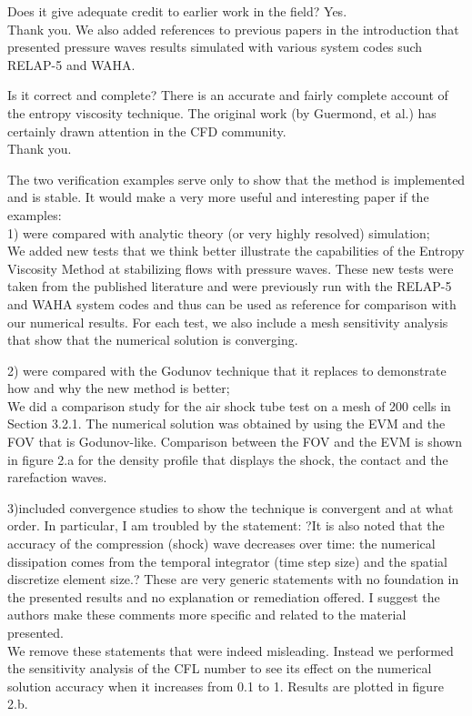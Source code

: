 \documentclass{article}
\begin{document}
\bigskip

{\color{blue}
Does it give adequate credit to earlier work in the field? Yes. \\
}
Thank you. We also added references to previous papers in the introduction that presented pressure waves results simulated with various system codes such RELAP-5 and WAHA.
\bigskip

{\color{blue}
Is it correct and complete?
There is an accurate and fairly complete account of the entropy viscosity technique. The original work (by Guermond, et al.) has certainly drawn attention in the CFD community.\\
}
Thank you.

\bigskip

{\color{blue}
The two verification examples serve only to show that the method is implemented and is stable. It would make a very more useful and interesting paper if the examples: \\
1) were compared with analytic theory (or very highly resolved) simulation; \\
}
We added new tests that we think better illustrate the capabilities of the Entropy Viscosity Method at stabilizing flows with pressure waves. These new tests were taken from the published literature and were previously run with the RELAP-5 and WAHA system codes and thus can be used as reference for comparison with our numerical results. For each test, we also include a mesh sensitivity analysis that show that the numerical solution is converging. 
\bigskip

{\color{blue}
2) were compared with the Godunov technique that it replaces to demonstrate how and why the new method is better; \\
}
We did a comparison study for the air shock tube test on a mesh of 200 cells in Section 3.2.1. The numerical solution was obtained by using the EVM and the FOV that is Godunov-like. Comparison between the FOV and the EVM is shown in figure 2.a for the density profile that displays the shock, the contact and the rarefaction waves.
\bigskip

{\color{blue}
3)included convergence studies to show the technique is convergent and at what order.
In particular, I am troubled by the statement: ?It is also noted that the accuracy of the compression (shock) wave decreases over time: the numerical dissipation comes from the temporal integrator (time step size) and the spatial discretize element size.? These are very generic statements with no foundation in the presented results and no explanation or remediation offered. I suggest the authors make these comments more specific and related to the material presented.
\\}
We remove these statements that were indeed misleading. Instead we performed the sensitivity analysis of the CFL number to see its effect on the numerical solution accuracy when it increases from 0.1 to 1. Results are plotted in figure 2.b. 
\bigskip
\end{document}
